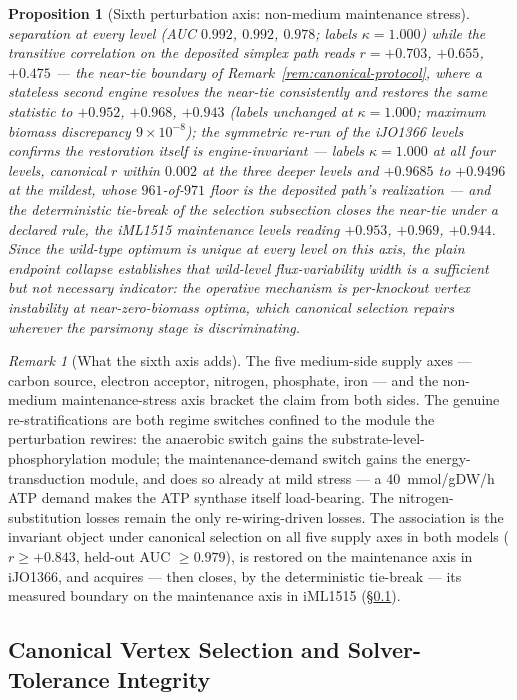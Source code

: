 \documentclass[11pt,a4paper]{article}
\theoremstyle{plain}
\newtheorem{proposition}[theorem]{Proposition}
\theoremstyle{definition}
\theoremstyle{remark}
\newtheorem{remark}[theorem]{Remark}
\begin{document}
\begin{proposition}[Sixth perturbation axis: non-medium
maintenance stress]
separation at every level (AUC $0.992$, $0.992$, $0.978$; labels
$\kappa=1.000$) while the transitive correlation on the deposited
simplex path reads $r=+0.703$, $+0.655$, $+0.475$ --- the near-tie
boundary of Remark~\ref{rem:canonical-protocol}, where a stateless
second engine resolves the near-tie consistently and restores the
same statistic to $+0.952$, $+0.968$, $+0.943$ (labels unchanged at
$\kappa=1.000$; maximum biomass discrepancy $9\times10^{-8}$); the
symmetric re-run of the iJO1366 levels confirms the restoration
itself is engine-invariant --- labels $\kappa=1.000$ at all four
levels, canonical $r$ within $0.002$ at the three deeper levels and
$+0.9685$ to $+0.9496$ at the mildest, whose $961$-of-$971$ floor is
the deposited path's realization --- and the deterministic tie-break
of the selection subsection closes the near-tie under a declared
rule, the iML1515 maintenance levels reading $+0.953$, $+0.969$,
$+0.944$. Since the wild-type optimum is
unique at every level on this axis, the plain endpoint collapse
establishes that wild-level flux-variability width is a sufficient
but not necessary indicator: the operative mechanism is per-knockout
vertex instability at near-zero-biomass optima, which canonical
selection repairs wherever the parsimony stage is discriminating.
\end{proposition}

\begin{remark}[What the sixth axis adds]
\label{rem:keio-multiaxis}
The five medium-side supply axes --- carbon source, electron
acceptor, nitrogen, phosphate, iron --- and the non-medium
maintenance-stress axis bracket the claim from both sides. The
genuine re-stratifications are both regime switches confined to
the module the perturbation rewires: the anaerobic switch gains
the substrate-level-phosphorylation module; the maintenance-demand
switch gains the energy-transduction module, and does so already
at mild stress --- a $40$~mmol/gDW/h ATP demand makes the ATP
synthase itself load-bearing. The nitrogen-substitution losses
remain the only re-wiring-driven losses. The association is the
invariant object under canonical selection on all five supply
axes in both models ($r\ge+0.843$, held-out AUC $\ge0.979$),
is restored on the maintenance axis in iJO1366, and acquires --- then closes, by the
deterministic tie-break --- its measured boundary on the maintenance
axis in iML1515 (\S\ref{sec:canonical-selection}).
\end{remark}

\subsection{Canonical Vertex Selection and Solver-Tolerance Integrity}
\label{sec:canonical-selection}
\end{document}
